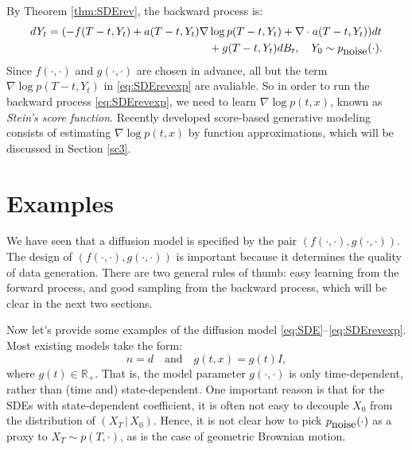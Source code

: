 \documentclass[letterpaper,11pt,reqno]{amsart}
\numberwithin{equation}{section}
\begin{document}
By Theorem \ref{thm:SDErev}, the backward process is:
\begin{equation}
\label{eq:SDErevexp}
\begin{aligned}
dY_t = (-f(T-t, Y_t) + a(T-t, Y_t) \nabla & \log p(T-t,  Y_t) + \nabla \cdot a(T-t, Y_t))dt  \\
&+ g(T-t, Y_t ) dB_t, \quad Y_0 \sim p_{\tiny \mbox{noise}}(\cdot).
 \end{aligned}
\end{equation}
Since $f(\cdot, \cdot)$ and $g(\cdot, \cdot)$ are chosen in advance, 
all but the term $\nabla \log p(T-t, Y_t)$ in \eqref{eq:SDErevexp} are avaliable. 
So in order to run the backward process \eqref{eq:SDErevexp}, 
we need to learn $\nabla \log p(t,x)$,
known as {\em Stein's score function}.
Recently developed score-based generative modeling consists of 
estimating $\nabla \log p(t,x)$ by function approximations, 
which will be discussed in Section \ref{sc3}.

\section{Examples}
\label{sc22}

\quad We have seen that a diffusion model is specified by the pair
$(f(\cdot, \cdot), g(\cdot, \cdot))$.
The design of $(f(\cdot, \cdot), g(\cdot, \cdot))$ is important
because it determines the quality of data generation.
There are two general rules of thumb:
easy learning from the forward process,
and good sampling from the backward process,
which will be clear in the next two sections.

\quad Now let's provide some examples of the diffusion model \eqref{eq:SDE}--\eqref{eq:SDErevexp}.
Most existing models take the form:
\begin{equation*}
\label{eq:simplify}
n = d \quad \mbox{and} \quad g (t,x) = g(t)I,
\end{equation*}
where $g(t) \in \mathbb{R}_+$.
That is, the model parameter $g(\cdot, \cdot)$ is only time-dependent,
rather than (time and) state-dependent. 
One important reason is that 
for the SDEs with state-dependent coefficient,
it is often not easy to decouple $X_0$ from the distribution of $(X_T \,|\, X_0)$.
Hence, it is not clear how to pick $p_{\tiny \mbox{noise}}(\cdot)$
as a proxy to $X_T \sim p(T, \cdot)$,
as is the case of geometric Brownian motion.
\end{document}
